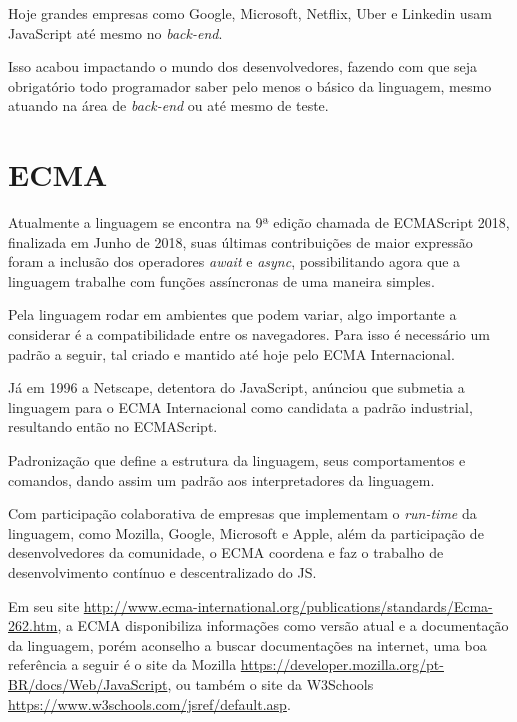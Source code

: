 \documentclass[
	12pt,				%
	openright,			%
	twoside,			%
	a4paper,			%
	english,			%
	brazil				%
	]{abntex2}
\begin{document}
Hoje grandes empresas como Google, Microsoft, Netflix, Uber e Linkedin usam JavaScript até mesmo no \textit{back-end}. 

Isso acabou impactando o mundo dos desenvolvedores, fazendo com que seja obrigatório todo programador saber pelo menos o básico da linguagem, mesmo atuando na área de \textit{back-end} ou até mesmo de teste.

\section{ECMA}
Atualmente a linguagem se encontra na 9ª edição chamada de ECMAScript 2018, finalizada em Junho de 2018, suas últimas contribuições de maior expressão foram a inclusão dos operadores \textit{await} e \textit{async}, possibilitando agora que a linguagem trabalhe com funções assíncronas de uma maneira simples. 

Pela linguagem rodar em ambientes que podem variar, algo importante a considerar é a compatibilidade entre os navegadores. Para isso é necessário um padrão a seguir, tal criado e mantido até hoje pelo ECMA Internacional.

Já em 1996 a Netscape, detentora do JavaScript, anúnciou que submetia a linguagem para o ECMA Internacional como candidata a padrão industrial, resultando então no ECMAScript.

Padronização que define a estrutura da linguagem, seus comportamentos e comandos, dando assim um padrão aos interpretadores da linguagem. 

Com participação colaborativa de empresas que implementam o \textit{run-time} da linguagem, como Mozilla, Google, Microsoft e Apple, além da participação de desenvolvedores da comunidade, o ECMA coordena e faz o trabalho de desenvolvimento contínuo e descentralizado do JS.

Em seu site \url{http://www.ecma-international.org/publications/standards/Ecma-262.htm}, a ECMA disponibiliza informações como versão atual e a documentação da linguagem, porém aconselho a buscar documentações na internet, uma boa referência a seguir é o site da Mozilla \url{https://developer.mozilla.org/pt-BR/docs/Web/JavaScript}, ou também o site da W3Schools \url{https://www.w3schools.com/jsref/default.asp}. 
\end{document}
